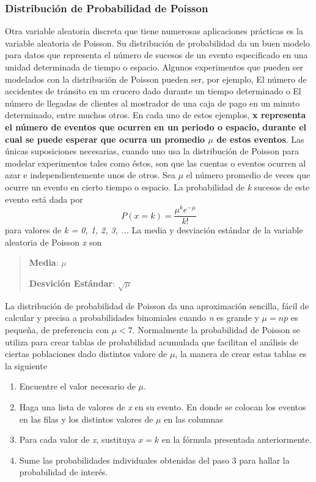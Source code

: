 \documentclass[]{article}
\begin{document}
 \subsubsection{Distribución de Probabilidad de Poisson}
 Otra variable aleatoria discreta que tiene numerosas aplicaciones prácticas es la variable aleatoria de Poisson. Su distribución de probabilidad da un buen modelo para datos que representa el número de sucesos de un evento especificado en una unidad determinada de tiempo o espacio. Algunos experimentos que pueden ser modelados con la distribución de Poisson pueden ser, por ejemplo, El número de accidentes de tránsito en un crucero dado durante un tiempo determinado o El número de llegadas de clientes al mostrador de una caja de pago en un minuto determinado, entre muchos otros. \newline
 En cada uno de estos ejemplos, \textbf{x representa el número de eventos que ocurren en un periodo o espacio, durante el cual se puede esperar que ocurra un promedio $\mu$ de estos eventos}. Las únicas suposiciones necesarias, cuando uno usa la distribución de Poisson para modelar experimentos tales como éstos, son que las cuentas o eventos ocurren al azar e independientemente unos de otros. \newline
 Sea $\mu$ el número promedio de veces que ocurre un evento en cierto tiempo o espacio. La probabilidad de \textit{k} sucesos de este evento está dada por
 \[ P(x=k) = \frac{\mu^ke^{-\mu}}{k!} \]
 para valores de \textit{k = 0, 1, 2, 3, ...} La media y desviación estándar de la variable aleatoria de Poisson \textit{x} son
 \begin{quote}
 	\item \textbf{Media}: $\mu$
 	\item \textbf{Desvición Estándar}: $\sqrt{\mu}$
 \end{quote}
 La distribución de probabilidad de Poisson da una aproximación sencilla, fácil de calcular y precisa a probabilidades binomiales cuando \textit{n} es grande y $\mu = np$ es pequeña, de preferencia con $\mu < 7$. \newline
 Normalmente la probabilidad de Poisson se utiliza para crear tablas de probabilidad acumulada que facilitan el análisis de ciertas poblaciones dado distintos valore de $\mu$, la manera de crear estas tablas es la siguiente
 \begin{enumerate}
 	\item Encuentre el valor necesario de $\mu$.
 	\item Haga una lista de valores de \textit{x} en su evento. En donde se colocan los eventos en las filas y los distintos valores de $\mu$ en las columnas
 	\item Para cada valor de \textit{x}, sustituya $x = k$ en la fórmula presentada anteriormente.
 	\item Sume las probabilidades individuales obtenidas del paso 3 para hallar la probabilidad de interés.
 \end{enumerate}
\end{document}
